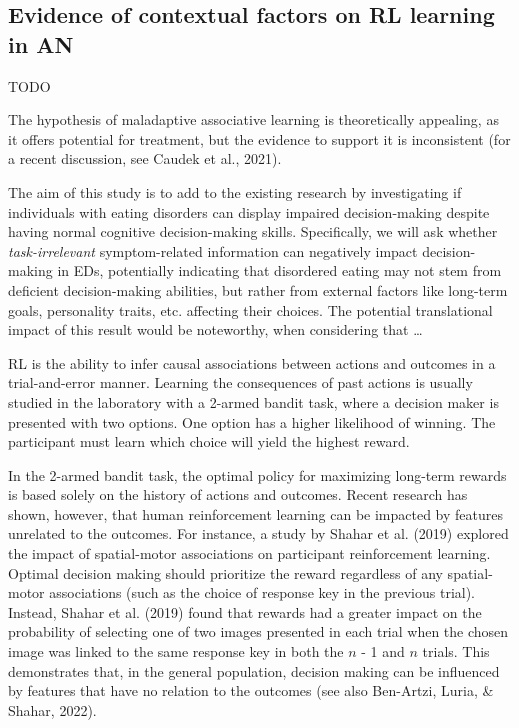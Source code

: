 \documentclass[
  man,floatsintext]{apa6}
\begin{document}
\hypertarget{evidence-of-contextual-factors-on-rl-learning-in-an}{%
\subsection{Evidence of contextual factors on RL learning in AN}\label{evidence-of-contextual-factors-on-rl-learning-in-an}}

TODO

The hypothesis of maladaptive associative learning is theoretically appealing, as it offers potential for treatment, but the evidence to support it is inconsistent (for a recent discussion, see Caudek et al., 2021).

The aim of this study is to add to the existing research by investigating if individuals with eating disorders can display impaired decision-making despite having normal cognitive decision-making skills. Specifically, we will ask whether \emph{task-irrelevant} symptom-related information can negatively impact decision-making in EDs, potentially indicating that disordered eating may not stem from deficient decision-making abilities, but rather from external factors like long-term goals, personality traits, etc. affecting their choices. The potential translational impact of this result would be noteworthy, when considering that \ldots{}

RL is the ability to infer causal associations between actions and outcomes in a trial-and-error manner. Learning the consequences of past actions is usually studied in the laboratory with a 2-armed bandit task, where a decision maker is presented with two options. One option has a higher likelihood of winning. The participant must learn which choice will yield the highest reward.

In the 2-armed bandit task, the optimal policy for maximizing long-term rewards is based solely on the history of actions and outcomes. Recent research has shown, however, that human reinforcement learning can be impacted by features unrelated to the outcomes. For instance, a study by Shahar et al. (2019) explored the impact of spatial-motor associations on participant reinforcement learning. Optimal decision making should prioritize the reward regardless of any spatial-motor associations (such as the choice of response key in the previous trial). Instead, Shahar et al. (2019) found that rewards had a greater impact on the probability of selecting one of two images presented in each trial when the chosen image was linked to the same response key in both the \(n\) - 1 and \(n\) trials. This demonstrates that, in the general population, decision making can be influenced by features that have no relation to the outcomes (see also Ben-Artzi, Luria, \& Shahar, 2022).
\end{document}
